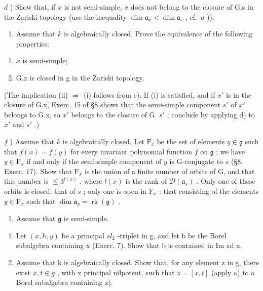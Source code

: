 \(d\) ) Show that, if \(x\) is not semi-simple, \(x\) does not belong to the closure of G.s in the Zariski topology (use the inequality \(\dim \mathfrak{a}_x < \dim \mathfrak{a}_s\) , cf.~\(a\) )).

\begin{enumerate}
\def\labelenumi{\alph{enumi})}
\setcounter{enumi}{4}
\tightlist
\item
  Assume that \(k\) is algebraically closed. Prove the equivalence of the following properties:
\end{enumerate}

\begin{enumerate}
\def\labelenumi{(\roman{enumi})}
\item
  \(x\) is semi-simple;
\item
  G.x is closed in g in the Zariski topology.
\end{enumerate}

(The implication (ii) \(\Longrightarrow\) (i) follows from c). If (i) is satisfied, and if \(x'\) is in the closure of G.x, Exerc. 15 of §8 shows that the semi-simple component \(s'\) of \(x'\) belongs to G.x, so \(x'\) belongs to the closure of G. \(s'\) ; conclude by applying d) to \(x'\) and \(s'\) .)

\(f\) ) Assume that \(k\) is algebraically closed. Let \(\mathrm{F}_x\) be the set of elements \(y\in \mathfrak{g}\) such that \(f(x) = f(y)\) for every invariant polynomial function \(f\) on \(\mathfrak{g}\) ; we have \(y\in \mathrm{F}_x\) if and only if the semi-simple component of \(y\) is G-conjugate to \(s\) (§8, Exerc. 17). Show that \(\mathrm{F}_x\) is the union of a finite number of orbits of G, and that this number is \(\leq 3^{l(x)}\) , where \(l(x)\) is the rank of \(\mathcal{D}(\mathfrak{a}_s)\) . Only one of these orbits is closed: that of \(s\) ; only one is open in \(\mathrm{F}_x\) : that consisting of the elements \(y\in \mathrm{F}_x\) such that \(\dim \mathfrak{a}_y = \operatorname {rk}(\mathfrak{g})\) .

\begin{enumerate}
\def\labelenumi{\arabic{enumi})}
\setcounter{enumi}{12}
\tightlist
\item
  Assume that \(\mathfrak{g}\) is semi-simple.
\end{enumerate}

\begin{enumerate}
\def\labelenumi{\alph{enumi})}
\item
  Let \((x, h, y)\) be a principal \(sl_{2}\) -triplet in g, and let b be the Borel subalgebra containing x (Exerc. 7). Show that b is contained in Im ad x.
\item
  Assume that k is algebraically closed. Show that, for any element z in g, there exist \(x, t \in g\) , with x principal nilpotent, such that \(z = [x, t]\) (apply a) to a Borel subalgebra containing z).
\end{enumerate}

